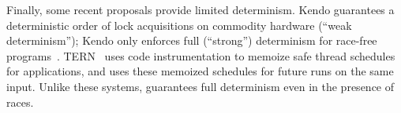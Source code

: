 Finally, some recent proposals provide limited determinism. Kendo
guarantees a deterministic order of lock acquisitions on commodity
hardware (``weak determinism''); Kendo only enforces full (``strong'')
determinism for race-free
programs~\cite{1508256}. TERN~\cite{stable-deterministic} uses code
instrumentation to memoize safe thread schedules for applications, and
uses these memoized schedules for future runs on the same
input. Unlike these systems, \dthreads{} guarantees full determinism even
in the presence of races.






